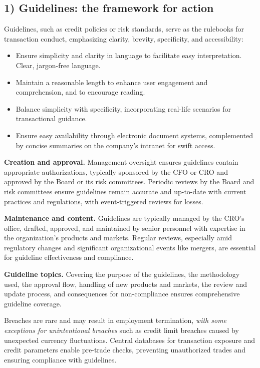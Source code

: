 \subsection*{1) Guidelines: the framework for action}

Guidelines, such as credit policies or risk standards, serve as the rulebooks for
transaction conduct, emphasizing clarity, brevity, specificity, and
accessibility:

\begin{itemize}
\item {} Ensure simplicity and clarity in language to
facilitate easy interpretation. Clear, jargon-free language.
\item {} Maintain a reasonable length to enhance user engagement and
comprehension, and to encourage reading.
\item {} Balance simplicity with specificity, incorporating
real-life scenarios for transactional guidance.
\item {} Ensure easy availability through electronic document
systems, complemented by concise summaries on the company's intranet for swift
access.
\end{itemize}

\textbf{Creation and approval.} Management oversight ensures guidelines contain
appropriate authorizations, typically sponsored by the CFO or CRO and approved by
the Board or its risk committees. Periodic reviews by the Board and risk
committees ensure guidelines remain accurate and up-to-date with current
practices and regulations, with event-triggered reviews for losses.

\textbf{Maintenance and content.} Guidelines are typically managed by the CRO's
office, drafted, approved, and maintained by senior personnel with expertise in
the organization's products and markets. Regular reviews, especially amid
regulatory changes and significant organizational events like mergers, are
essential for guideline effectiveness and compliance.

\textbf{Guideline topics.} Covering the purpose of the guidelines, the
methodology used, the approval flow, handling of new products and markets, the
review and update process, and consequences for non-compliance ensures
comprehensive guideline coverage.

\begin{crtrapbox}
Breaches are rare and may result in employment termination, \emph{with some
exceptions for unintentional breaches} such as credit limit breaches caused by
unexpected currency fluctuations. Central databases for transaction exposure and
credit parameters enable pre-trade checks, preventing unauthorized trades and
ensuring compliance with guidelines.
\end{crtrapbox}

